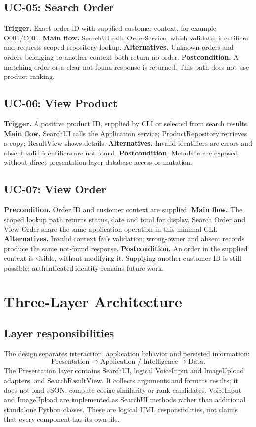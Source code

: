 \documentclass[11pt,a4paper]{article}
\begin{document}
\subsection{UC-05: Search Order}
\textbf{Trigger.} Exact order ID with supplied customer context, for example O001/C001. \textbf{Main flow.} SearchUI calls OrderService, which validates identifiers and requests scoped repository lookup. \textbf{Alternatives.} Unknown orders and orders belonging to another context both return no order. \textbf{Postcondition.} A matching order or a clear not-found response is returned. This path does not use product ranking.

\subsection{UC-06: View Product}
\textbf{Trigger.} A positive product ID, supplied by CLI or selected from search results. \textbf{Main flow.} SearchUI calls the Application service; ProductRepository retrieves a copy; ResultView shows details. \textbf{Alternatives.} Invalid identifiers are errors and absent valid identifiers are not-found. \textbf{Postcondition.} Metadata are exposed without direct presentation-layer database access or mutation.

\subsection{UC-07: View Order}
\textbf{Precondition.} Order ID and customer context are supplied. \textbf{Main flow.} The scoped lookup path returns status, date and total for display. Search Order and View Order share the same application operation in this minimal CLI. \textbf{Alternatives.} Invalid context fails validation; wrong-owner and absent records produce the same not-found response. \textbf{Postcondition.} An order in the supplied context is visible, without modifying it. Supplying another customer ID is still possible; authenticated identity remains future work.

\section{Three-Layer Architecture}\label{sec:architecture}
\subsection{Layer responsibilities}
The design separates interaction, application behavior and persisted information:
\begin{equation}
\text{Presentation}\rightarrow\text{Application / Intelligence}\rightarrow\text{Data}.
\end{equation}
The Presentation layer contains SearchUI, logical VoiceInput and ImageUpload adapters, and SearchResultView. It collects arguments and formats results; it does not load JSON, compute cosine similarity or rank candidates. VoiceInput and ImageUpload are implemented as SearchUI methods rather than additional standalone Python classes. These are logical UML responsibilities, not claims that every component has its own file.
\end{document}
